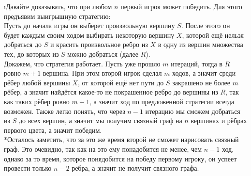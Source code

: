 \i Давайте доказывать, что при любом $n$ первый игрок может победить. Для этого предъявим выигрышную стратегию:\\
Пусть до начала игры он выберет произвольную вершину $S$. После этого он будет каждым своим ходом выбирать некоторую вершину $X$, которой ещё нельзя добраться до $S$ и красить произвольное ребро из $X$ в одну из вершин множества тех, до которых из $S$ можно добраться (далее $R$).\\
Докажем, что стратегия работает. Пусть уже прошло $m$ итераций, тогда в $R$ ровно $m+1$ вершина. При этом второй игрок сделал $m$ ходов, а значит среди рёбер любой вершины $X$, от которой ещё нет пути до $S$ закрашено не более $m$ рёбер, а значит найдётся какое-то не покрашенное ребро до вершины из $R$, так как таких рёбер ровно $m+1$, а значит ход по предложенной стратегии всегда возможен. Также легко понять, что через $n-1$ итерацию мы сможем добраться из $S$ до всех вершин, а значит мы получим связный граф на $n$ вершинах и рёбрах первого цвета, а значит победим.\\
*Осталось заметить, что за это же время второй не сможет нарисовать связный граф. Это очевидно, так как на это ему понадобится не менее, чем $n-1$ ход, однако за то время, которое понядобится на победу первому игроку, он успеет провести только $n-2$ ребра, а значит не получит связного графа.
